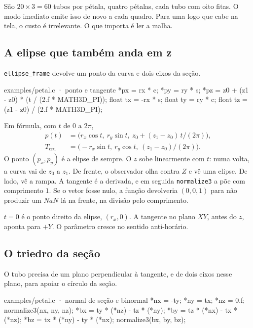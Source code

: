\documentclass[11pt,a4paper]{article}
\newcommand{\fn}[1]{\texttt{\nobreak\hspace{0pt}#1}}
\begin{document}
São \(20 \times 3 = 60\) tubos por pétala, quatro pétalas, cada tubo com oito fitas. O modo imediato emite isso de novo a cada quadro. Para uma logo que cabe na tela, o custo é irrelevante. O que importa é ler a malha.

\subsection{A elipse que também anda em z}

\fn{ellipse\_frame} devolve um ponto da curva e dois eixos da seção.

\begin{codigo}{examples/petal.c · ponto e tangente}
*px = rx * c;
*py = ry * s;
*pz = z0 + (z1 - z0) * (t / (2.f * MATH3D_PI));
float tx = -rx * s;
float ty = ry * c;
float tz = (z1 - z0) / (2.f * MATH3D_PI);
\end{codigo}

Em fórmula, com \(t\) de \(0\) a \(2\pi\),
\begin{equation}
\begin{aligned}
p(t) &= \big(r_x\cos t,\ r_y\sin t,\ z_0 + (z_1 - z_0)\, t/(2\pi)\big),\\[0.25em]
T_{\text{cru}} &= \big(-r_x\sin t,\ r_y\cos t,\ (z_1 - z_0)/(2\pi)\big).
\end{aligned}
\label{eq:elipse}
\end{equation}
O ponto \((p_x, p_y)\) é a elipse de sempre. O \(z\) sobe linearmente com \(t\): numa volta, a curva vai de \(z_0\) a \(z_1\). De frente, o observador olha contra \(Z\) e vê uma elipse. De lado, vê a rampa. A tangente é a derivada, e em seguida \fn{normalize3} a põe com comprimento \(1\). Se o vetor fosse nulo, a função devolveria \((0, 0, 1)\) para não produzir um \(NaN\) lá na frente, na divisão pelo comprimento.

\(t = 0\) é o ponto direito da elipse, \((r_x, 0)\). A tangente no plano \(XY\), antes do \(z\), aponta para \(+Y\). O parâmetro cresce no sentido anti-horário.

\subsection{O triedro da seção}

O tubo precisa de um plano perpendicular à tangente, e de dois eixos nesse plano, para apoiar o círculo da seção.

\begin{codigo}{examples/petal.c · normal de seção e binormal}
*nx = -ty;
*ny = tx;
*nz = 0.f;
normalize3(nx, ny, nz);
*bx = ty * (*nz) - tz * (*ny);
*by = tz * (*nx) - tx * (*nz);
*bz = tx * (*ny) - ty * (*nx);
normalize3(bx, by, bz);
\end{codigo}
\end{document}
